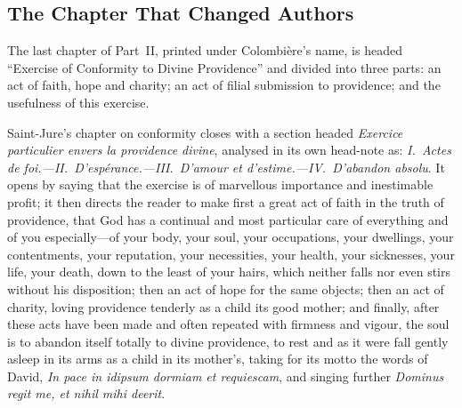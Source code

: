 \subsection{The Chapter That Changed Authors}

The last chapter of Part~II, printed under Colombière's name, is headed ``Exercise of Conformity to Divine Providence'' and divided into three parts: an act of faith, hope and charity; an act of filial submission to providence; and the usefulness of this exercise.

Saint-Jure's chapter on conformity closes with a section headed \emph{Exercice particulier envers la providence divine}, analysed in its own head-note as: \emph{I.~Actes de foi.---II.~D'espérance.---III.~D'amour et d'estime.---IV.~D'abandon absolu}. It opens by saying that the exercise is of marvellous importance and inestimable profit; it then directs the reader to make first a great act of faith in the truth of providence, that God has a continual and most particular care of everything and of you especially---of your body, your soul, your occupations, your dwellings, your contentments, your reputation, your necessities, your health, your sicknesses, your life, your death, down to the least of your hairs, which neither falls nor even stirs without his disposition; then an act of hope for the same objects; then an act of charity, loving providence tenderly as a child its good mother; and finally, after these acts have been made and often repeated with firmness and vigour, the soul is to abandon itself totally to divine providence, to rest and as it were fall gently asleep in its arms as a child in its mother's, taking for its motto the words of David, \emph{In pace in idipsum dormiam et requiescam}, and singing further \emph{Dominus regit me, et nihil mihi deerit}.

